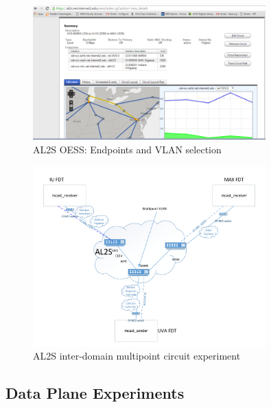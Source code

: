 \begin{figure}[htb!]
\centering
\includegraphics[width=0.8\textwidth]{figures/oess-AL2S.png}
\caption{AL2S OESS: Endpoints and VLAN selection}
\label{fig:oessal2s}
\end{figure}

\begin{figure}[htb!]
\centering
\includegraphics[width=0.8\textwidth]{figures/AL2S-mcast.pdf}
\caption{AL2S inter-domain multipoint circuit experiment}
\label{fig:wanmulticast}
\end{figure}




\subsection{Data Plane Experiments}
